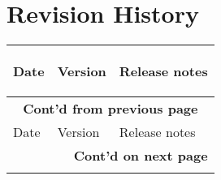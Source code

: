\chapter*{Revision History}\label{revision-history}

\begin{longtable}[l]{ | m{2cm} | m{1.5cm} | m{12cm} | } \hline

    \rowcolor{lightgray}
    Date & Version & \hypertarget{Release notes}{Release notes}\\\hline
    \endfirsthead

    \multicolumn{3}{c}{\bfseries Cont'd from previous page}\\\hline
    \rowcolor{lightgray}
    Date & Version & Release notes\\\hline
    \endhead

    \multicolumn{3}{r}{\textbf{Cont'd on next page}}\\
    \endfoot

    \endlastfoot


\end{longtable}
